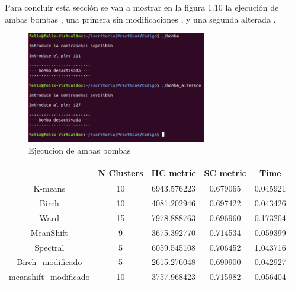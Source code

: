 	Para concluir esta sección se van a mostrar en la figura 1.10 la ejecución de ambas bombas , una primera sin modificaciones , y una segunda alterada .\\
	
	\begin{figure}[htb]
		\centering
		\includegraphics[width=0.7\textwidth]{./imagenes/12}
		\caption{Ejecucion de ambas bombas} \label{fig:1}
	\end{figure}
	
	\vspace{0.06in}
	
	\begin{tabular}{c | c | c | c | c}
		\toprule
		{} &  N Clusters &    HC metric &  SC metric &      Time \\
		\midrule
		K-means              &          10 &  6943.576223 &   0.679065 &  0.045921 \\
		Birch                &          10 &  4081.202946 &   0.697422 &  0.043426 \\
		Ward                 &          15 &  7978.888763 &   0.696960 &  0.173204 \\
		MeanShift            &           9 &  3675.392770 &   0.714534 &  0.059399 \\
		Spectral             &           5 &  6059.545108 &   0.706452 &  1.043716 \\
		Birch\_modificado     &           5 &  2615.276048 &   0.690900 &  0.042927 \\
		meanshift\_modificado &          10 &  3757.968423 &   0.715982 &  0.056404 \\
		\bottomrule
	\end{tabular}
	
	\vspace{0.06in}
		

	


